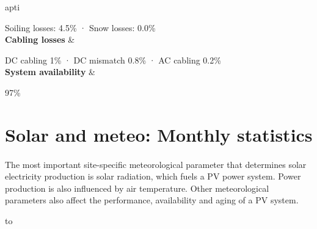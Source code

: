 apti     \documentclass[10pt,a4paper,UTF8]{article}
\begin{document}
{\begin{longtabu}
     Soiling losses: 4.5\% · Snow losses: 0.0\%
     \\\hline \textbf{Cabling losses} & 
    
     DC cabling 1\% · DC mismatch 0.8\% · AC cabling 0.2\%
     \\\hline \textbf{System availability} & 
    
     97\%
     \\\hline 
    
%    
     \end{longtabu} 
    
%    

\newpage{}
\section{ Solar and meteo: Monthly statistics }
\setcounter{figure}{0}
\setcounter{table}{0}

\paragraph{} The most important site-specific meteorological parameter that determines solar electricity production is solar radiation, which fuels a PV power system. Power production is also influenced by air temperature. Other meteorological parameters also affect the performance, availability and aging of a PV system.%


%


 {\footnotesize 

     \begin{longtabu} to \textwidth{ X[1,L]X[1,R]X[1,R]X[1,R]X[1,R]X[1,R]X[1,R] }
    

\end{longtabu}}}
\end{document}
